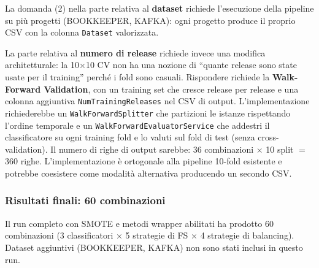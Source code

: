 La domanda (2) nella parte relativa al \textbf{dataset} richiede l'esecuzione della
pipeline su più progetti (BOOKKEEPER, KAFKA): ogni progetto produce il proprio CSV con la
colonna \texttt{Dataset} valorizzata.

La parte relativa al \textbf{numero di release} richiede invece una modifica
architetturale: la 10$\times$10 CV non ha una nozione di ``quante release sono state usate
per il training'' perché i fold sono casuali. Rispondere richiede la \textbf{Walk-Forward
Validation}, con un training set che cresce release per release e una colonna aggiuntiva
\texttt{NumTrainingReleases} nel CSV di output. L'implementazione richiederebbe un
\texttt{WalkForwardSplitter} che partizioni le istanze rispettando l'ordine temporale
e un \texttt{WalkForwardEvaluatorService} che addestri il classificatore su ogni
training fold e lo valuti sul fold di test (senza cross-validation). Il numero di righe
di output sarebbe: 36 combinazioni $\times$ 10 split $=$ 360 righe. L'implementazione è
ortogonale alla pipeline 10-fold esistente e potrebbe coesistere come modalità alternativa
producendo un secondo CSV.

\subsubsection{Risultati finali: 60 combinazioni}

Il run completo con SMOTE e metodi wrapper abilitati ha prodotto 60 combinazioni
(3 classificatori $\times$ 5 strategie di FS $\times$ 4 strategie di balancing).
Dataset aggiuntivi (BOOKKEEPER, KAFKA) non sono stati inclusi in questo run.

